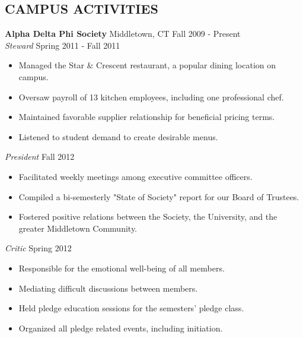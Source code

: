 \documentclass[11pt]{res} %
\begin{document}
\begin{resume}
\section{CAMPUS ACTIVITIES} 
{\bf Alpha Delta Phi Society} Middletown, CT \hfill Fall 2009 - Present\\
{\it Steward} \hfill Spring 2011 - Fall 2011\\
\vspace{-0.17in}
 \begin{itemize} \itemsep -2pt
   \item Managed the Star \& Crescent restaurant, a popular dining location on
   campus.  
   \item Oversaw payroll of 13 kitchen employees, including one professional 
   chef.  
   \item Maintained favorable supplier relationship for beneficial pricing 
   terms.  
   \item Listened to student demand to create desirable menus.
   \end{itemize}

\vspace{-0.1in}
   
{\it President } \hfill Fall 2012\\
\vspace{-0.17in}
 \begin{itemize} \itemsep -2pt
   \item Facilitated weekly meetings among executive committee officers.
   \item Compiled a bi-semesterly "State of Society" report for our Board of 
   Trustees.
   \item Fostered positive relations between the Society, the University, and 
   the greater Middletown Community.
   \end{itemize}

\vspace{-0.1in}
   
{\it Critic } \hfill Spring 2012\\
\vspace{-0.17in}
 \begin{itemize} \itemsep -2pt
   \item Responsible for the emotional well-being of all members.
   \item Mediating difficult discussions between members.
   \item Held pledge education sessions for the semesters' pledge class.
   \item Organized all pledge related events, including initiation.
   \end{itemize}



\end{resume}
\end{document}
